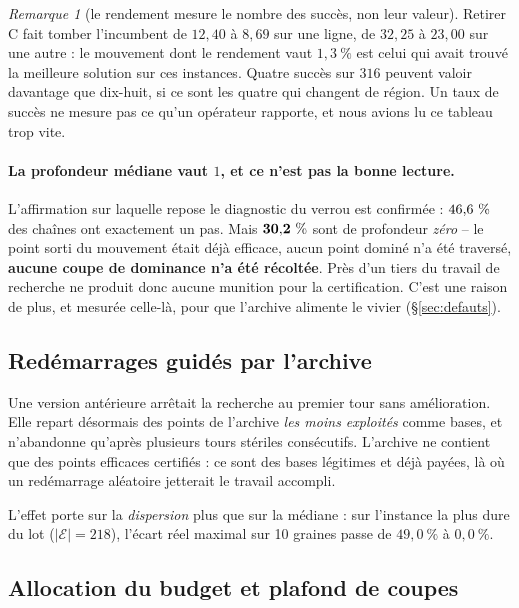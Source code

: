 \documentclass[11pt,a4paper]{article}
\theoremstyle{plain}
\theoremstyle{remark}
\newtheorem{remark}{Remarque}
\newcommand{\Ecal}{\mathcal{E}}
\begin{document}
\begin{remark}[le rendement mesure le nombre des succès, non leur valeur]
Retirer C fait tomber l'incumbent de $12{,}40$ à $8{,}69$ sur une ligne, de
$32{,}25$ à $23{,}00$ sur une autre : le mouvement dont le rendement vaut
$1{,}3\ \%$ est celui qui avait trouvé la meilleure solution sur ces
instances. Quatre succès sur $316$ peuvent valoir davantage que dix-huit,
si ce sont les quatre qui changent de région. Un taux de succès ne mesure
pas ce qu'un opérateur rapporte, et nous avions lu ce tableau trop vite.
\end{remark}

\paragraph{La profondeur médiane vaut $1$, et ce n'est pas la bonne
lecture.} L'affirmation sur laquelle repose le diagnostic du verrou est
confirmée : $46{,}6{}\ \%$ des chaînes ont exactement un pas. Mais
$\mathbf{30{,}2{}\ \%}$ sont de profondeur \emph{zéro} -- le point sorti du
mouvement était déjà efficace, aucun point dominé n'a été traversé,
\textbf{aucune coupe de dominance n'a été récoltée}. Près d'un tiers du
travail de recherche ne produit donc aucune munition pour la certification.
C'est une raison de plus, et mesurée celle-là, pour que l'archive alimente
le vivier (§\ref{sec:defauts}).

\subsection{Redémarrages guidés par l'archive}

Une version antérieure arrêtait la recherche au premier tour sans
amélioration. Elle repart désormais des points de l'archive \emph{les moins
exploités} comme bases, et n'abandonne qu'après plusieurs tours stériles
consécutifs. L'archive ne contient que des points efficaces certifiés : ce
sont des bases légitimes et déjà payées, là où un redémarrage aléatoire
jetterait le travail accompli.

L'effet porte sur la \emph{dispersion} plus que sur la médiane : sur
l'instance la plus dure du lot ($|\Ecal|=218$), l'écart réel maximal sur
10 graines passe de $49{,}0\ \%$ à $0{,}0\ \%$.

\subsection{Allocation du budget et plafond de coupes}
\end{document}
